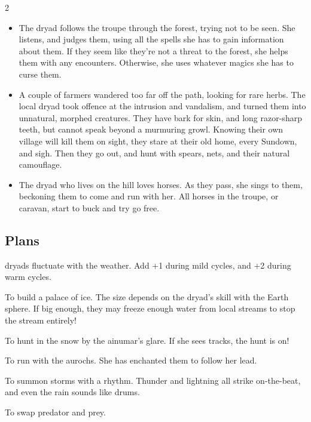 \begin{multicols}{2}
\begin{itemize}
  The troupe find her eating a corpse while her pet bear sits beside her, eating another.
  She just stares at them, while chewing slowly.
  \item
  The \gls{dryad} follows the troupe through the forest, trying not to be seen.
  She listens, and judges them, using all the spells she has to gain information about them.
  If they seem like they're not a threat to the forest, she helps them with any encounters.
  Otherwise, she uses whatever magics she has to curse them.
  \item
  A couple of farmers wandered too far off the path, looking for rare herbs.
  The local \gls{dryad} took offence at the intrusion and vandalism, and turned them into unnatural, morphed creatures.
  They have bark for skin, and long razor-sharp teeth, but cannot speak beyond a murmuring growl.
  Knowing their own \gls{village} will kill them on sight, they stare at their old home, every Sundown, and sigh.
  Then they go out, and hunt with spears, nets, and their natural camouflage.
  \item
  The \gls{dryad} who lives on the hill loves horses.
  As they pass, she sings to them, beckoning them to come and run with her.
  All horses in the troupe, or caravan, start to buck and try go free.
\end{itemize}

\morphhuman

\subsection{Plans}
\Glspl{dryad} fluctuate with the weather.
Add +1 during mild \glspl{cycle}, and +2 during warm \glspl{cycle}.

\begin{dlist}
  \item
  To build a palace of ice.
  The size depends on the \gls{dryad}'s skill with the Earth \gls{sphere}.
  If big enough, they may freeze enough water from local streams to stop the stream entirely!
  \item
  To hunt in the snow by the \gls{ainumar}'s glare.
  If she sees tracks, the hunt is on!
  \item
  To run with the aurochs.
  She has enchanted them to follow her lead.
  \item
  To summon storms with a rhythm.
  Thunder and lightning all strike on-the-beat, and even the rain sounds like drums.
  \item
  To swap predator and prey.


\end{dlist}
\end{multicols}
